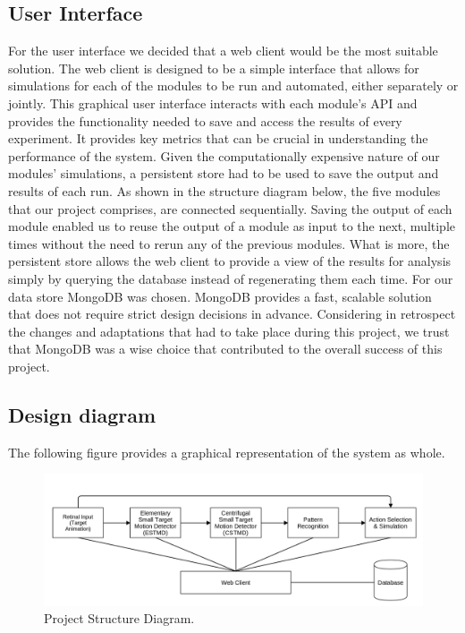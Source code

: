 \documentclass[a4paper,11pt]{article}
\begin{document}
\subsection{User Interface}
For the user interface we decided that a web client would be the most suitable solution. The web client is designed to be a simple interface that allows for simulations for each of the modules to be run and automated, either separately or jointly. This graphical user interface interacts with each module's API and provides the functionality needed to save and access the results of every experiment. It provides key metrics that can be crucial in understanding the performance of the system.
Given the computationally expensive nature of our modules' simulations, a persistent store had to be used to save the output and results of each run. As shown in the structure diagram below, the five modules that our project comprises, are connected sequentially. Saving the output of each module enabled us to reuse the output of a module as input to the next, multiple times without the need to rerun any of the previous modules. What is more, the persistent store allows the web client to provide a view of the results for analysis simply by querying the database instead of regenerating them each time.
For our data store MongoDB was chosen. MongoDB provides a fast, scalable solution that does not require strict design decisions in advance. Considering in retrospect the changes and adaptations that had to take place during this project, we trust that MongoDB was a wise choice that contributed to the overall success of this project.


\subsection{Design diagram}
The following figure provides a graphical representation of the system as whole. 

\begin{figure}[hb]
\centering
\includegraphics[scale = 0.4]{designblockdiagram2}
\caption{Project Structure Diagram.}
\end{figure}
\end{document}
